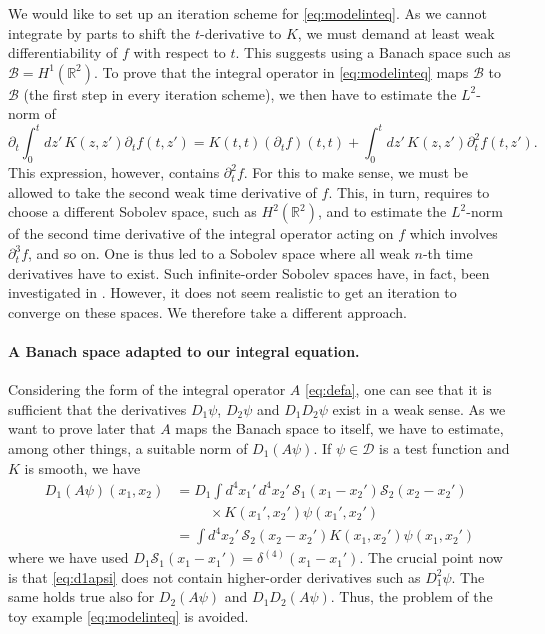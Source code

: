 \documentclass[b5paper,draft,openbib,12pt]{memoir}
\newcommand{\R}{\mathbb{R}}
\newcommand{\Banach}{\mathscr{B}}
\begin{document}
We would like to set up an iteration scheme for 
\eqref{eq:modelinteq}. As we cannot integrate by parts to 
shift the $t$-derivative to $K$, we must demand at least 
weak differentiability of $f$ with respect to $t$. This 
suggests using a Banach space such as $\Banach = H^1(\R^2)$.
To prove that the integral operator in \eqref{eq:modelinteq} 
maps $\Banach$ to $\Banach$ (the first step in every 
iteration scheme), we then have to estimate the $L^2$-norm of
\begin{equation}
	\partial_t \int_0^t dz' \, K(z,z') \partial_t f(t,z') = K(t,t) (\partial_t f)(t,t) + \int_0^t dz' \, K(z,z') \partial_t^2 f(t,z').
\end{equation}
This expression, however, contains $\partial_t^2 f$. For this to make sense, we must be allowed to take the second weak time derivative of $f$. This, in turn, requires to choose a different Sobolev space, such as $H^2(\R^2)$, and to estimate the $L^2$-norm of the second time derivative of the integral operator acting on $f$ which involves $\partial_t^3 f$, and so on. One is thus led to a Sobolev space where all weak $n$-th time derivatives have to exist. Such infinite-order Sobolev spaces have, in fact, been investigated in \cite{dubinskii_1991}. However, it does not seem realistic to get an iteration to converge on these spaces. We therefore take a different approach. 

\paragraph{A Banach space adapted to our integral equation.} Considering the form of the integral operator $A$ \eqref{eq:defa}, one can see that it is sufficient that the derivatives $D_1 \psi$, $D_2 \psi$ and $D_1 D_2 \psi$ exist in a weak sense. As we want to prove later that $A$ maps the Banach space to itself, we have to estimate, among other things, a suitable norm of $D_1 (A \psi)$. If $\psi \in \mathscr{D}$ is a test function and $K$ is smooth, we have
\begin{align}\nonumber
  D_1 (A \psi)(x_1,x_2) &= D_1 \int d^4 x_1' \, d^4 x_2' \, \mathscr{S}_1(x_1-x_2') \mathscr{S}_2(x_2-x_2')\\
  &\hspace{1cm}\times K(x_1',x_2') \psi(x_1',x_2')\nonumber\\
	&= \int d^4 x_2' \, \mathscr{S}_2(x_2-x_2') K(x_1,x_2') \psi(x_1,x_2')
\label{eq:d1apsi}
\end{align}
where we have used $D_1 \mathscr{S}_1(x_1-x_1') = \delta^{(4)}(x_1-x_1')$. The crucial point now is that \eqref{eq:d1apsi} does not contain higher-order derivatives such as $D_1^2 \psi$. The same holds true also for $D_2 (A \psi)$ and $D_1 D_2 (A\psi)$. Thus, the problem of the toy example \eqref{eq:modelinteq} is avoided.
\end{document}
